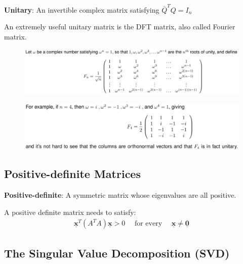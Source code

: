 \documentclass[10pt,a4paper]{article}
\begin{document}
\begin{tcolorbox}[breakable,colback=white]
\textbf{Unitary}: An invertible complex matrix satisfying $\bar{Q}^T Q = I_n$
\end{tcolorbox}

\pagebreak

An extremely useful unitary matrix is the DFT matrix, also called Fourier matrix.
\begin{figure} [h!]
    \centering
    \includegraphics[scale=0.4]{2.JPG}
\end{figure}
\begin{figure} [h!]
    \centering
    \includegraphics[scale=0.4]{3.JPG}
\end{figure}

\subsection{Positive-deﬁnite Matrices}

\begin{tcolorbox}[breakable,colback=white]
\textbf{Positive-definite}: A symmetric matrix whose eigenvalues are all positive.
\end{tcolorbox}

A positive definite matrix needs to satisfy:
\begin{align*}
    \underline{\mathbf{x}}^{T}\left(A^{T} A\right) \underline{\mathbf{x}}>0 \quad \text { for every } \quad \underline{\mathbf{x}} \neq \underline{\mathbf{0}}
\end{align*}

\subsection{The Singular Value Decomposition (SVD)}
\end{document}
